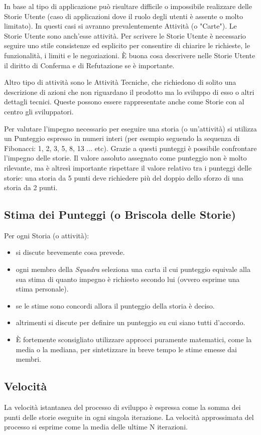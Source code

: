 In base al tipo di applicazione pu\`o risultare difficile o impossibile realizzare delle Storie Utente (caso di applicazioni dove il ruolo degli utenti \`e assente o molto limitato).
In questi casi si avranno prevalentemente Attivit\`a (o "Carte"). Le Storie Utente sono anch'esse attivit\`a.
Per scrivere le Storie Utente \`e necessario seguire uno stile consistenze ed esplicito per consentire di chiarire le richieste, le funzionalit\`a, i limiti e le negoziazioni.
\`E buona cosa descrivere nelle Storie Utente il diritto di Conferma e di Refutazione se \`e importante.

Altro tipo di attivit\`a sono le Attivit\`a Tecniche, che richiedono di solito una descrizione di azioni che non riguardano il prodotto ma lo sviluppo di esso o altri dettagli tecnici.
Queste possono essere rappresentate anche come Storie con al centro gli sviluppatori.

Per valutare l'impegno necessario per eseguire una storia (o un'attivit\`a) si utilizza un Punteggio espresso in numeri interi (per esempio seguendo la sequenza di Fibonacci: 1, 2, 3, 5, 8, 13 ... etc).
Grazie a questi punteggi \`e possibile confrontare l'impegno delle storie. Il valore assoluto assegnato come punteggio non \`e molto rilevante, ma \`e altres\`i importante rispettare il valore relativo tra i punteggi delle storie: una storia da 5 punti deve richiedere più del doppio dello sforzo di una storia da 2 punti.

\subsection{Stima dei Punteggi (o Briscola delle Storie)}


Per ogni Storia (o attivit\`a):
\begin{itemize}
  \item si discute brevemente cosa prevede.
  \item ogni membro della \textit{Squadra} seleziona una carta il cui punteggio equivale alla sua stima di quanto impegno \`e richiesto secondo lui (ovvero esprime una stima personale).
  \item se le stime sono concordi allora il punteggio della storia \`e deciso.
  \item altrimenti si discute per definire un punteggio su cui siano tutti d'accordo.
  \item \`E fortemente sconsigliato utilizzare approcci puramente matematici, come la media o la mediana, per sintetizzare in breve tempo le stime emesse dai membri.
\end{itemize}

\subsection{Velocit\`a}

La velocit\`a istantanea del processo di sviluppo \`e espressa come la somma dei punti delle storie eseguite in ogni singola iterazione.
La velocit\`a approssimata del processo si esprime come la media delle ultime N iterazioni.
